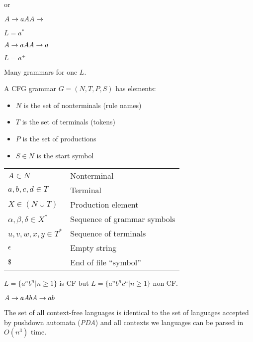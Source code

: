 \documentclass[11pt,twocolumn,nocopyright]{sigplanconf}
\begin{document}
or

 \noindent $
A \rightarrow a A \\
A \rightarrow \\
$

$L = {a^*}$

\noindent $
A \rightarrow a A \\
A \rightarrow a\\
$

$L = {a^+}$

Many grammars for one $L$.

A  CFG grammar $G = (N, T, P, S)$ has elements:

\vspace{-3pt}
\begin{itemize}\itemsep0pt \parskip0pt 
\item $N$ is the set of nonterminals (rule names)
\item $T$ is the set of terminals (tokens)
\item $P$ is the set of productions
\item $S \in N$ is the start symbol
\end{itemize}

\begin{center}\small 
\begin{tabular}{l  l}
$A  \in N$		    & Nonterminal \\
$a,b,c,d  \in T$ 	    & Terminal \\
$X  \in (N \cup T)  $ & Production element \\
$\alpha, \beta, \delta \in X^*$  & Sequence of grammar symbols\\
$u,v,w,x,y \in T^*$             & Sequence of terminals\\
$\epsilon$ & Empty string \\
$\char36$ & End of file ``symbol'' \\
\end{tabular}
\end{center}


$L = \{a^nb^n | n \ge 1\}$ is CF but $L = \{a^nb^nc^n | n \ge 1\}$ non CF.

\noindent $
A \rightarrow a A b\\
A \rightarrow a b\\
$

The set of all context-free languages is identical to the set of languages accepted by pushdown automata ({\em PDA}) and all contexts we languages can be parsed in $O(n^3)$ time.
\end{document}
